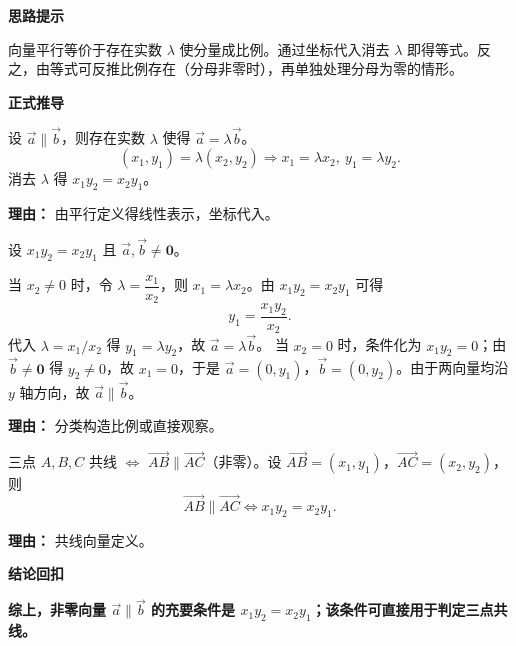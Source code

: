 \begin{proofbox}
	\textbf{\textcolor{CProof}{思路提示}}

	向量平行等价于存在实数 $\lambda$ 使分量成比例。通过坐标代入消去 $\lambda$ 即得等式。反之，由等式可反推比例存在（分母非零时），再单独处理分母为零的情形。

	\medskip
	\textbf{\textcolor{CProof}{正式推导}}
	\begin{description}[style=nextline, leftmargin=2.8em, labelsep=0.5em, itemsep=0.55em]
		\item[\textbf{步骤一（必要性推导）：}] 设 $\vec{a}\parallel\vec{b}$，则存在实数 $\lambda$ 使得 $\vec{a} = \lambda\vec{b}$。
			\[
				(x_1,y_1) = \lambda(x_2,y_2) \Rightarrow x_1 = \lambda x_2,\ y_1 = \lambda y_2.
			\]
			消去 $\lambda$ 得 $x_1y_2 = x_2y_1$。
			\par\textbf{理由：} 由平行定义得线性表示，坐标代入。
		\item[\textbf{步骤二（充分性证明）：}] 设 $x_1y_2 = x_2y_1$ 且 $\vec{a},\vec{b}\neq\mathbf{0}$。
			\par
			当 $x_2\neq0$ 时，令 $\lambda = \dfrac{x_1}{x_2}$，则 $x_1=\lambda x_2$。由 $x_1y_2 = x_2y_1$ 可得
			\[
				y_1 = \frac{x_1y_2}{x_2}.
			\]
			代入 $\lambda = x_1/x_2$ 得 $y_1 = \lambda y_2$，故 $\vec{a} = \lambda\vec{b}$。
			当 $x_2 = 0$ 时，条件化为 $x_1y_2=0$；由 $\vec{b}\neq\mathbf{0}$ 得 $y_2\neq0$，故 $x_1=0$，于是 $\vec{a}=(0,y_1)$，$\vec{b}=(0,y_2)$。由于两向量均沿 $y$ 轴方向，故 $\vec{a}\parallel\vec{b}$。
			\par\textbf{理由：} 分类构造比例或直接观察。
		\item[\textbf{步骤三（三点共线转化）：}] 三点 $A,B,C$ 共线 $\iff$ $\overrightarrow{AB}\parallel\overrightarrow{AC}$（非零）。设 $\overrightarrow{AB}=(x_1,y_1)$，$\overrightarrow{AC}=(x_2,y_2)$，则
			\[
				\overrightarrow{AB}\parallel\overrightarrow{AC} \iff x_1y_2 = x_2y_1.
			\]
			\par\textbf{理由：} 共线向量定义。
	\end{description}

	\medskip
	\textbf{\textcolor{CProof}{结论回扣}}

	\textbf{综上，非零向量 $\vec{a}\parallel\vec{b}$ 的充要条件是 $x_1y_2=x_2y_1$；该条件可直接用于判定三点共线。}
\end{proofbox}
